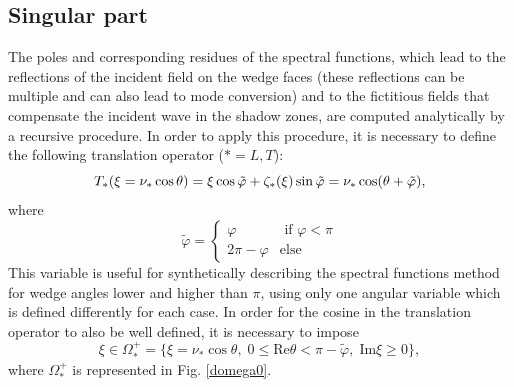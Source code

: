 \subsection{Singular part}
\label{C3:singpart}
The poles and corresponding residues of the spectral functions, which lead to the reflections of the incident field on the wedge faces (these reflections can be multiple and can also lead to mode conversion) and to the fictitious fields that compensate the incident wave in the shadow zones, are computed analytically by a recursive procedure. In order to apply this procedure, it is necessary to define the following translation operator ($*=L,T$):
\begin{equation}
T_*(\xi=\nu_*\cos\theta)=\xi \cos \tilde{\varphi}+\zeta_*(\xi)\sin\tilde{\varphi}=\nu_*\cos(\theta+\tilde{\varphi}),
\end{equation}
where
\begin{equation}
\tilde{\varphi}=
\left\{
\begin{matrix}
\varphi & \mbox{ if } \varphi < \pi \\
2\pi-\varphi & \mbox{else}
\end{matrix}
\right.
\label{phitilde}
\end{equation}
This variable is useful for synthetically describing the spectral functions method for wedge angles lower and higher than $\pi$, using only one angular variable which is defined differently for each case. In order for the cosine in the translation operator to also be well defined, it is necessary to impose
\begin{equation}
\xi \in \Omega_*^+= \{ \xi=\nu_* \cos \theta, \; 0 \leq \mbox{Re} \theta < \pi-\tilde{\varphi}, \; \mbox{Im}\xi\geq0 \},
\label{defOmega0}
\end{equation}
where $\Omega_*^+$ is represented in Fig. \ref{domega0}.

